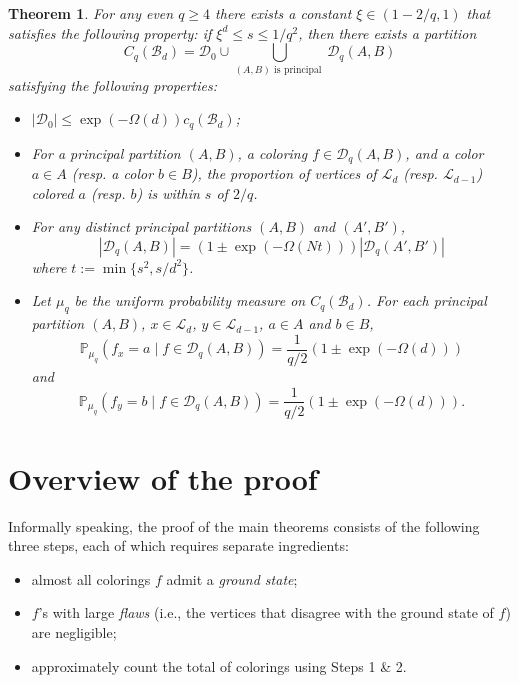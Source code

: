 \documentclass{amsart}
\newtheorem{thm}{Theorem}[section]
\theoremstyle{definition}
\newcommand{\cB}{\mathcal{B} }
\newcommand{\cD}{\mathcal{D} }
\newcommand{\cL}{\mathcal{L} }
\newcommand{\0}[0]{\emptyset}
\newcommand{\pr}[0]{\mathbb{P}}
\begin{document}
\begin{thm}\label{notMT}
For any even $q\ge 4$ there exists a constant $\xi \in (1 - 2/q,1)$ that satisfies the following property: if $\xi^d\leq s\leq 1/q^2$, then there exists a partition
\[
C_q(\cB_d) = \cD_0\cup \bigcup_{(A, B) \text{ is principal }} \cD_q(A, B)
\]
satisfying the following properties:
\begin{itemize}
\item[(i)] $|\cD_0|\leq \exp(-\Omega(d))c_q(\cB_d)$;

\item[(ii)] For a principal partition $(A, B)$, a coloring $f \in \cD_q(A, B)$, and a color $a \in A$ (resp. a color $b\in B$), the proportion of vertices of $\cL_d$ (resp. $\cL_{d-1}$) colored $a$  (resp. $b$) is within $s$ of $2/q$.

\item[(iii)] For any distinct principal partitions $(A, B)$ and $(A',B')$, 
\[|\cD_q(A, B)| =\left(1  \pm \exp\left(-\Omega\left(Nt\right)\right)\right)|\cD_q(A', B')|\]
where $t:=\min\{s^2, s/d^2\}$.

\item[(iv)] Let $\mu_q$ be the uniform probability measure on $C_q(\cB_d)$.
For each principal partition $(A, B)$, $x\in \cL_{d}$, $y\in \cL_{d-1}$,  $a\in A$ and $b\in B$,
\[
\pr_{\mu_q}\left(f_x=a\mid f\in \cD_q(A, B)\right)=\frac1{q/2}(1 \pm \exp(-\Omega(d)))
\]
and
\[
\pr_{\mu_q}\left(f_y=b\mid f\in \cD_q(A, B)\right)=\frac1{q/2}(1 \pm \exp(-\Omega(d))).
\] 
\end{itemize}
\end{thm}



\section{Overview of the proof}\label{sec:overview}

Informally speaking, the proof of the main theorems consists of the following three steps, each of which requires separate ingredients:
\begin{itemize}
\item[Step 1.] almost all colorings $f$ admit a \textit{ground state};
\item[Step 2.] $f$'s with large \textit{flaws} (i.e., the vertices that disagree with the ground state of $f$) are negligible;
\item[Step 3.] approximately count the total of colorings using Steps 1 \& 2. 
\end{itemize}
\end{document}

